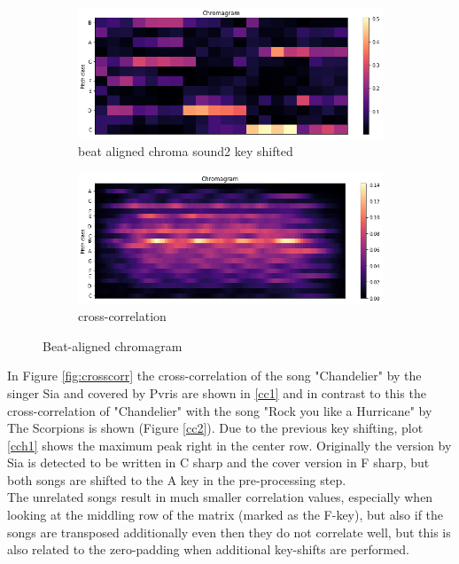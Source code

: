 \begin{figure}[htbp]
{{			\begin{subfigure}{.495\textwidth}
				\centering     
				\includegraphics[scale=0.3]{Images/Chroma/beatalignedchroma2_ks.png}
				\caption{beat aligned chroma sound2 key shifted}
				\label{cks2}
			\end{subfigure}%
			\begin{subfigure}{.495\textwidth}
				\centering     
				\includegraphics[scale=0.3]{Images/Chroma/beatalignedchroma_corr.png}
				\caption{cross-correlation}
				\label{c2}
			\end{subfigure}%
	}}
	\caption{Beat-aligned chromagram}
	\label{fig:beatalign}
\end{figure}
In Figure \ref{fig:crosscorr} the cross-correlation of the song "Chandelier" by the singer Sia and covered by Pvris are shown in \ref{cc1} and in contrast to this the cross-correlation of "Chandelier" with the song "Rock you like a Hurricane" by The Scorpions is shown (Figure \ref{cc2}). Due to the previous key shifting, plot \ref{cch1} shows the maximum peak right in the center row. Originally the version by Sia is detected to be written in C sharp and the cover version in F sharp, but both songs are shifted to the A key in the pre-processing step.\\
The unrelated songs result in much smaller correlation values, especially when looking at the middling row of the matrix (marked as the F-key), but also if the songs are transposed additionally even then they do not correlate well, but this is also related to the zero-padding when additional key-shifts are performed. 
